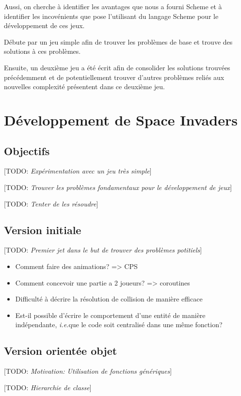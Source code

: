 \documentclass[12pt,oneside,letterpaper,francais]{book}
\newcommand{\todo}[1]{[TODO: {\it #1}]}
\newcommand{\ie}{{\textit{i.e.}}}
\begin{document}
Aussi, on cherche à identifier les avantages que nous a fourni Scheme
et à identifier les incovénients que pose l'utilisant du langage
Scheme pour le développement de ces jeux.

Débute par un jeu simple afin de trouver les problèmes de base et
trouve des solutions à ces problèmes.

Ensuite, un deuxième jeu a été écrit afin de consolider les solutions
trouvées précédemment et de potentiellement trouver d'autres problèmes
reliés aux nouvelles complexité présentent dans ce deuxième jeu.

\section{Développement de \og Space Invaders \fg}

\subsection{Objectifs}
\todo{Expérimentation avec un jeu très simple}

\todo{Trouver les problèmes fondamentaux pour le développement de jeux}

\todo{Tenter de les résoudre}

\subsection{Version initiale}
\todo{Premier jet dans le but de trouver des problèmes potitiels}

\begin{itemize}
\item Comment faire des animations? => CPS
\item Comment concevoir une partie a 2 joueurs? => coroutines
\item Difficulté à décrire la résolution de collision de manière
  efficace 
\item Est-il possible d'écrire le comportement d'une entité de manière
  indépendante, \ie que le code soit centralisé dans une même
  fonction?
\end{itemize}

\subsection{Version orientée objet}
\todo{Motivation: Utilisation de fonctions génériques}

\todo{Hierarchie de classe}
\end{document}
